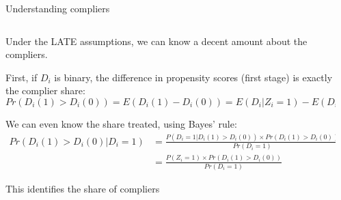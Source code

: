 \documentclass[notes,11pt, aspectratio=169]{beamer}
\newenvironment{wideitemize}{\itemize\addtolength{\itemsep}{10pt}}{\enditemize}
\begin{document}
\begin{frame}{Understanding compliers}
  \begin{columns}[T] %
    \begin{column}{0.7\textwidth}
      \begin{wideitemize}
      \item Under the LATE assumptions, we can know a decent amount about the compliers.
      \item First, if $D_{i}$ is binary, the difference in propensity scores (first stage) is exactly the complier share:
        \begin{equation*}
          Pr(D_{i}(1) > D_{i}(0)) = E(D_{i}(1) - D_{i}(0)) = E(D_{i} | Z_{i} = 1) - E(D_{i}|Z_{i}=0)
        \end{equation*}
      \item We can even know the share treated, using Bayes' rule:
        \begin{align*}
          Pr(D_{i}(1) > D_{i}(0) | D_{i} = 1) &= \frac{P(D_{i} = 1 | D_{i}(1) > D_{i}(0)) \times Pr(D_{i}(1) > D_{i}(0))}{Pr(D_{i} = 1)}\\
          &=\frac{P(Z_{i} = 1) \times Pr(D_{i}(1) > D_{i}(0))}{Pr(D_{i} = 1)}
        \end{align*}
      \item This identifies the share of compliers
      \end{wideitemize}
\end{column}
\begin{column}{0.3\textwidth}
\end{column}
\end{columns}

  
\end{frame}
\end{document}
